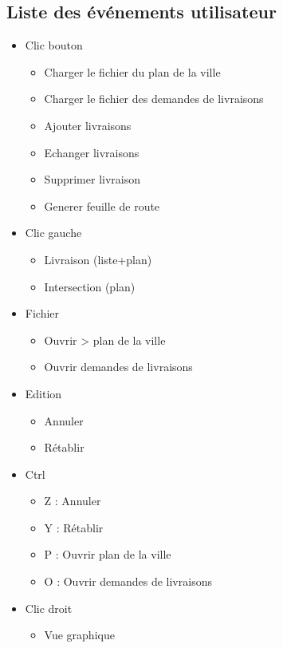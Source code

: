 \documentclass[10pt,a4paper]{book}
\begin{document}
\subsection{Liste des événements utilisateur}
\begin{itemize}
	\item{Clic bouton}
	\begin{itemize}
		\item{Charger le fichier du plan de la ville}
		\item{Charger le fichier des demandes de livraisons}
		\item{Ajouter livraisons}
		\item{Echanger livraisons}
		\item{Supprimer livraison}
		\item{Generer feuille de route}
	\end{itemize}
	\item{Clic gauche}
	\begin{itemize}
		\item{Livraison (liste+plan)}
		\item{Intersection (plan)}	
	\end{itemize}
	\item{Fichier}
	\begin{itemize}
		\item{Ouvrir > plan de la ville}
		\item{Ouvrir demandes de livraisons}
	\end{itemize}
	\item{Edition}	
	\begin{itemize}
		\item{Annuler}
		\item{Rétablir}
	\end{itemize}
	\item{Ctrl}
	\begin{itemize}
		\item{Z : Annuler}
		\item{Y : Rétablir}
		\item{P : Ouvrir plan de la ville}
		\item{O : Ouvrir demandes de livraisons}
	\end{itemize}
	\item{Clic droit}
	\begin{itemize}
		\item{Vue graphique}
	\end{itemize}	
\end{itemize}
\newpage
\end{document}
